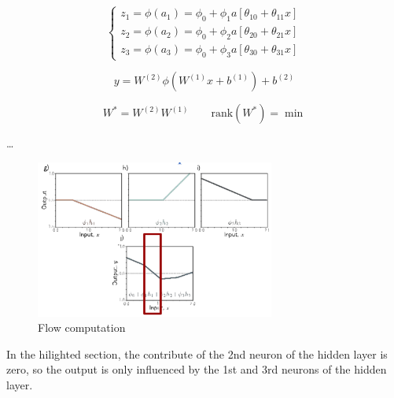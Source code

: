 $$
\begin{cases}
    z_1 = \phi(a_1) = \phi_0 + \phi_1 a[\theta_{10} + \theta_{11} x]
    \\
    z_2 = \phi(a_2) = \phi_0 + \phi_2 a[\theta_{20} + \theta_{21} x]
    \\
    z_3 = \phi(a_3) = \phi_0 + \phi_3 a[\theta_{30} + \theta_{31} x]
\end{cases}
$$

\begin{center}
\end{center}


$$
y = W^{(2)} \phi (W^{(1)} x + b^{(1)}) + b^{(2)}
$$

$$
W^* = W^{(2)} W^{(1)} \quad \quad \text{rank}(W^*) = \min
$$

\dots

\begin{figure}[H]
    \centering
    \includegraphics[width=0.7\textwidth]{assets/flow_comp.png}
    \caption{Flow computation}
    \label{fig:flow_comp}
\end{figure}

In the hilighted section, the contribute of the 2nd neuron of the hidden layer is zero, so the output is only influenced by the 1st and 3rd neurons of the hidden layer.

